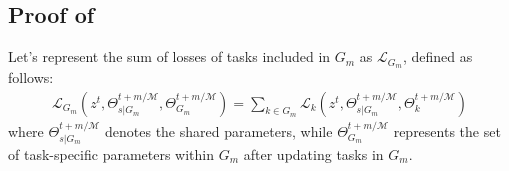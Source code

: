 \subsection{Proof of }
\label{Append:theorem4}

\theomfour*

Let's represent the sum of losses of tasks included in $G_m$ as $\mathcal{L}_{G_m}$, defined as follows:
\begin{align}
    \mathcal{L}_{G_m}(z^t, \Theta_{s|G_m}^{t+m/\mathcal{M}}, \Theta_{G_m}^{t+m/\mathcal{M}}) = \sum_{k \in G_m} \mathcal{L}_k(z^t, \Theta_{s|G_m}^{t+m/\mathcal{M}}, \Theta_{k}^{t+m/\mathcal{M}})
\end{align}
where $\Theta_{s|G_m}^{t+m/\mathcal{M}}$ denotes the shared parameters, while $\Theta_{G_m}^{t+m/\mathcal{M}}$  represents the set of task-specific parameters within $G_m$ after updating tasks in $G_m$.

